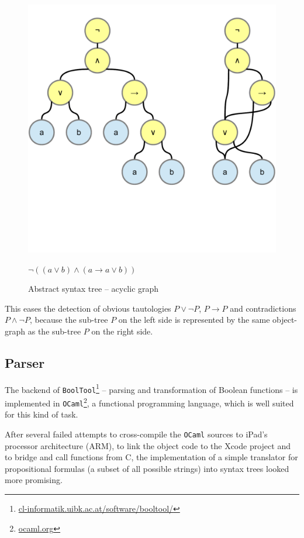 \begin{figure}[htb]
\begin{center}
\includegraphics[scale=0.5,trim=0cm 5.4cm 0cm 1cm,clip=true]{diagrams/AcyclicSyntaxGraph.pdf}
\caption{Abstract syntax tree – acyclic graph }{$\neg( (a\vee b) \wedge (a \rightarrow a\vee b))$}
\label{fig:AST+ASG}
\end{center}
\end{figure}

This eases the detection of obvious tautologies $P \vee \neg P$, $P \rightarrow P$ and contradictions $P \wedge \neg P$,
because the sub-tree $P$ on the left side is represented by the same object-graph as the sub-tree $P$ on the right side.


\subsection{Parser}

The backend of \verb+BoolTool+\footnote{
\href{http://cl-informatik.uibk.ac.at/software/booltool/}{cl-informatik.uibk.ac.at/software/booltool/}} 
– parsing and transformation of Boolean functions – 
is implemented in \verb+OCaml+\footnote{
\href{http://ocaml.org}{ocaml.org}}, 
a functional programming language, which is well suited for this kind of task.

After several failed attempts to cross-compile the \verb+OCaml+ sources to iPad's processor architecture (ARM),
to link the object code to the Xcode project and to bridge and call functions from C, 
the implementation of a simple translator 
for propositional formulas (a subset of all possible strings)
into syntax trees looked more promising. 


